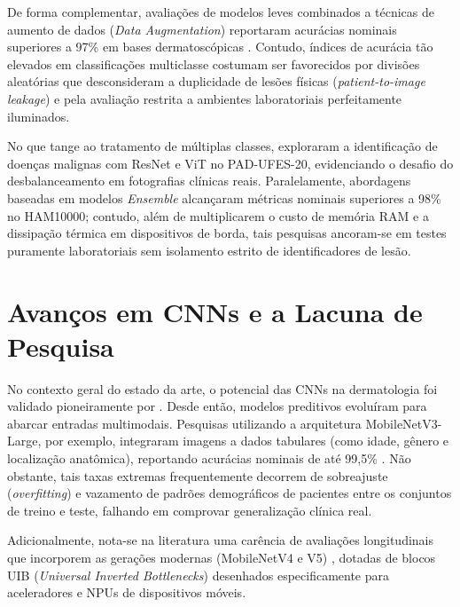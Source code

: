 \documentclass[oneside,english,brazilian]{UNISINOSmonografia}
\begin{document}
De forma complementar, avaliações de modelos leves combinados a técnicas de aumento de dados (\textit{Data Augmentation}) \cite{shorten2019survey} reportaram acurácias nominais superiores a 97\% em bases dermatoscópicas \cite{lightweight2023mobilenet}. Contudo, índices de acurácia tão elevados em classificações multiclasse costumam ser favorecidos por divisões aleatórias que desconsideram a duplicidade de lesões físicas (\textit{patient-to-image leakage}) e pela avaliação restrita a ambientes laboratoriais perfeitamente iluminados. 

No que tange ao tratamento de múltiplas classes,  exploraram a identificação de doenças malignas com ResNet e ViT no PAD-UFES-20, evidenciando o desafio do desbalanceamento em fotografias clínicas reais. Paralelamente, abordagens baseadas em modelos \textit{Ensemble} \cite{chatterjee2024early} alcançaram métricas nominais superiores a 98\% no HAM10000; contudo, além de multiplicarem o custo de memória RAM e a dissipação térmica em dispositivos de borda, tais pesquisas ancoram-se em testes puramente laboratoriais sem isolamento estrito de identificadores de lesão.

\section{Avanços em CNNs e a Lacuna de Pesquisa}
No contexto geral do estado da arte, o potencial das CNNs na dermatologia foi validado pioneiramente por . Desde então, modelos preditivos evoluíram para abarcar entradas multimodais. Pesquisas utilizando a arquitetura MobileNetV3-Large, por exemplo, integraram imagens a dados tabulares (como idade, gênero e localização anatômica), reportando acurácias nominais de até 99,5\% \cite{mobilev3large2023}. Não obstante, tais taxas extremas frequentemente decorrem de sobreajuste (\textit{overfitting}) e vazamento de padrões demográficos de pacientes entre os conjuntos de treino e teste, falhando em comprovar generalização clínica real.

Adicionalmente, nota-se na literatura uma carência de avaliações longitudinais que incorporem as gerações modernas (MobileNetV4 e V5) \cite{qin2024mobilenetv4_google, wightman2025mobilenetv5_google}, dotadas de blocos UIB (\textit{Universal Inverted Bottlenecks}) desenhados especificamente para aceleradores e NPUs de dispositivos móveis.
\end{document}
